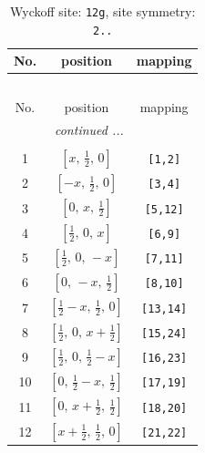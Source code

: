 \documentclass[fleqn,8pt]{jsarticle}
\begin{document}
\begin{longtable}{ccc}
\caption{Wyckoff site: {\tt 12g}, site symmetry: {\tt 2..}}
 \\
 \hline \hline
No. & position & mapping \\ \hline \endfirsthead

\multicolumn{2}{l}{\tablename\ \thetable{}} \\
 \hline \hline
No. & position & mapping \\ \hline \endhead

 \hline \hline
\multicolumn{2}{r}{\footnotesize\it continued ...} \\ \endfoot

 \hline \hline
\multicolumn{2}{r}{} \\ \endlastfoot

1 & $\left[ x,\, \frac{1}{2},\, 0 \right]$ & {\tt [1,2]} \\ \hline
2 & $\left[ - x,\, \frac{1}{2},\, 0 \right]$ & {\tt [3,4]} \\ \hline
3 & $\left[ 0,\, x,\, \frac{1}{2} \right]$ & {\tt [5,12]} \\ \hline
4 & $\left[ \frac{1}{2},\, 0,\, x \right]$ & {\tt [6,9]} \\ \hline
5 & $\left[ \frac{1}{2},\, 0,\, - x \right]$ & {\tt [7,11]} \\ \hline
6 & $\left[ 0,\, - x,\, \frac{1}{2} \right]$ & {\tt [8,10]} \\ \hline
7 & $\left[ \frac{1}{2} - x,\, \frac{1}{2},\, 0 \right]$ & {\tt [13,14]} \\ \hline
8 & $\left[ \frac{1}{2},\, 0,\, x + \frac{1}{2} \right]$ & {\tt [15,24]} \\ \hline
9 & $\left[ \frac{1}{2},\, 0,\, \frac{1}{2} - x \right]$ & {\tt [16,23]} \\ \hline
10 & $\left[ 0,\, \frac{1}{2} - x,\, \frac{1}{2} \right]$ & {\tt [17,19]} \\ \hline
11 & $\left[ 0,\, x + \frac{1}{2},\, \frac{1}{2} \right]$ & {\tt [18,20]} \\ \hline
12 & $\left[ x + \frac{1}{2},\, \frac{1}{2},\, 0 \right]$ & {\tt [21,22]} \\
\end{longtable}
\renewcommand{\arraystretch}{1.2}
\end{document}
